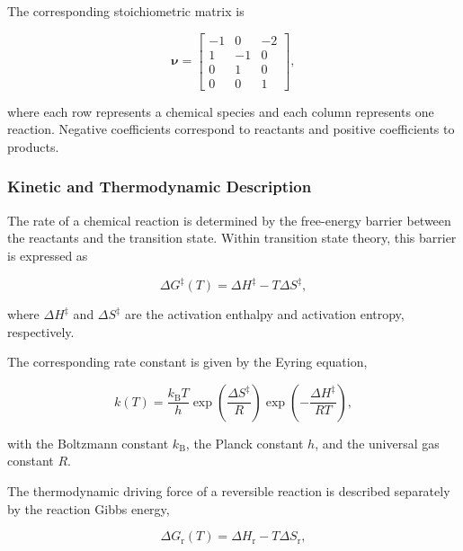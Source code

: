 The corresponding stoichiometric matrix is

\begin{equation}
    \boldsymbol{\nu}
    =
    \begin{bmatrix}
        -1 &  0 & -2 \\
         1 & -1 &  0 \\
         0 &  1 &  0 \\
         0 &  0 &  1
    \end{bmatrix},
\end{equation}

where each row represents a chemical species and each column represents one
reaction. Negative coefficients correspond to reactants and positive
coefficients to products.


\subsubsection{Kinetic and Thermodynamic Description}

The rate of a chemical reaction is determined by the free-energy barrier
between the reactants and the transition state. Within transition state
theory, this barrier is expressed as

\begin{equation}
    \Delta G^\ddagger(T)
    =
    \Delta H^\ddagger
    -
    T\Delta S^\ddagger,
\end{equation}

where $\Delta H^\ddagger$ and $\Delta S^\ddagger$ are the activation
enthalpy and activation entropy, respectively.

The corresponding rate constant is given by the Eyring equation,

\begin{equation}
    k(T)
    =
    \frac{k_{\mathrm{B}}T}{h}
    \exp\left(
        \frac{\Delta S^\ddagger}{R}
    \right)
    \exp\left(
        -\frac{\Delta H^\ddagger}{RT}
    \right),
\end{equation}

with the Boltzmann constant $k_{\mathrm{B}}$, the Planck constant $h$,
and the universal gas constant $R$.

The thermodynamic driving force of a reversible reaction is described
separately by the reaction Gibbs energy,

\begin{equation}
    \Delta G_{\mathrm{r}}(T)
    =
    \Delta H_{\mathrm{r}}
    -
    T\Delta S_{\mathrm{r}},
\end{equation}

